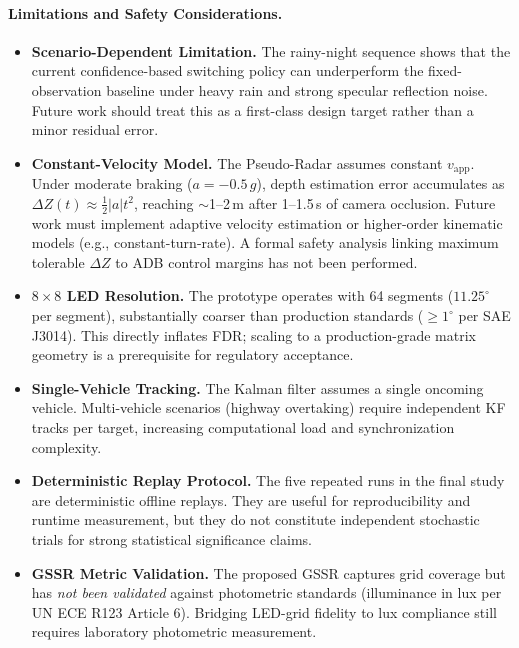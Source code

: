 \documentclass[pdflatex,sn-mathphys-num]{sn-jnl}%
\theoremstyle{thmstyleone}%
\theoremstyle{thmstyletwo}%
\theoremstyle{thmstylethree}%
\begin{document}
\paragraph{Limitations and Safety Considerations.}
\begin{itemize}[leftmargin=*]
  \item \textbf{Scenario-Dependent Limitation.} The rainy-night
    sequence shows that the current confidence-based switching policy
    can underperform the fixed-observation baseline under heavy rain and
    strong specular reflection noise. Future work should treat this as a
    first-class design target rather than a minor residual error.
  \item \textbf{Constant-Velocity Model.} The Pseudo-Radar assumes
    constant $v_{\mathrm{app}}$. Under moderate braking
    ($a = -0.5\,g$), depth estimation error accumulates as
    $\Delta Z(t) \approx \frac{1}{2}|a|t^2$, reaching ${\sim}$1--2\,m
    after 1--1.5\,s of camera occlusion. Future work must implement
    adaptive velocity estimation or higher-order kinematic models
    (e.g., constant-turn-rate). A formal safety analysis linking
    maximum tolerable $\Delta Z$ to ADB control margins has not been
    performed.
  \item \textbf{$8\times8$ LED Resolution.} The prototype operates
    with 64 segments ($11.25^\circ$ per segment), substantially coarser
    than production standards ($\geq1^\circ$ per SAE J3014). This directly
    inflates FDR; scaling to a production-grade matrix geometry is a
    prerequisite for regulatory acceptance.
  \item \textbf{Single-Vehicle Tracking.} The Kalman filter assumes
    a single oncoming vehicle. Multi-vehicle scenarios (highway
    overtaking) require independent KF tracks per target, increasing
    computational load and synchronization complexity.
  \item \textbf{Deterministic Replay Protocol.} The five repeated runs
    in the final study are deterministic offline replays. They are
    useful for reproducibility and runtime measurement, but they do not
    constitute independent stochastic trials for strong statistical
    significance claims.
  \item \textbf{GSSR Metric Validation.} The proposed GSSR captures
    grid coverage but has \emph{not been validated} against photometric
    standards (illuminance in lux per UN ECE R123 Article 6). Bridging
    LED-grid fidelity to lux compliance still requires laboratory
    photometric measurement.
\end{itemize}
\end{document}
